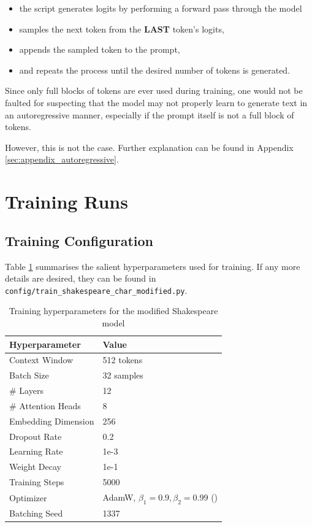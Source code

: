 \documentclass{article} %
\theoremstyle{definition}
\begin{document}
\begin{itemize}
    \item the script generates logits by performing a forward pass through the model
    \item samples the next token from the \textbf{LAST} token's logits,
    \item appends the sampled token to the prompt,
    \item and repeats the process until the desired number of tokens is generated.
\end{itemize}

Since only full blocks of tokens are ever used during training,
one would not be faulted for suspecting that the model may
not properly learn to generate text in an autoregressive manner,
especially if the prompt itself is not a full block of tokens.

However, this is not the case. Further explanation can be found
in Appendix \ref{sec:appendix_autoregressive}.

\section{Training Runs}
\subsection{Training Configuration}
Table \ref{tab:training-hyperparameters} summarises the salient hyperparameters used for training.
If any more details are desired, they can be found in \texttt{config/train\_shakespeare\_char\_modified.py}.

\begin{table}
    \centering
    \begin{tabular}{|p{}|p{}|}
        \hline
        \textbf{Hyperparameter} & \textbf{Value} \\ \hline
        Context Window & 512 tokens \\ \hline
        Batch Size & 32 samples \\ \hline
        \# Layers & 12 \\ \hline
        \# Attention Heads & 8 \\ \hline
        Embedding Dimension & 256 \\ \hline
        Dropout Rate & 0.2 \\ \hline
        Learning Rate & 1e-3 \\ \hline
        Weight Decay & 1e-1 \\ \hline
        Training Steps & 5000 \\ \hline
        Optimizer & AdamW, $\beta_1 = 0.9, \beta_2 = 0.99$ (\cite{adamw})\\ \hline
        Batching Seed & 1337 \\ \hline
    \end{tabular}
    \caption{Training hyperparameters for the modified Shakespeare model}
    \label{tab:training-hyperparameters}
\end{table}
\end{document}
